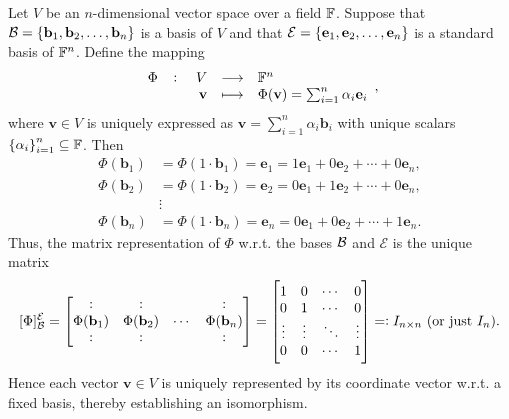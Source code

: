\documentclass[11pt,openany]{article}
\renewcommand{\vec}[1]{\mathbf{#1}}
\begin{document}
\begin{example*}
\begin{center}
\begin{tikzpicture}[scale=1, >=Stealth]
\end{tikzpicture}
\end{center}
\vfill
Let \(V\) be an \(n\)-dimensional vector space over a field \(\F\). Suppose that \(\basis=\{\vec{b}_1, \vec{b}_2, \dots, \vec{b}_n\}\) is a basis of $V$ and that $\mathcal{E}=\set{\vec{e}_1,\vec{e}_2,\dots,\vec{e}_n}$ is a standard basis of $\F^n$. 
Define the mapping \[
\fullfunction{\Phi}{V}{\F^n}{\vec{v}}{\Phi(\vec{v})=\sum_{i=1}^{n}\alpha_i\vec{e}_i},
\] where $\vec{v}\in V$ is uniquely expressed as $\vec{v}=\sum_{i=1}^{n}\alpha_i\vec{b}_i$ with unique scalars $\set{\alpha_i}_{i=1}^n\subseteq\F$. Then 
\begin{align*}
	\Phi(\vec{b}_1)&=\Phi(1\cdot\vec{b}_1)=\vec{e}_1=1\vec{e}_1+0\vec{e}_2+\cdots+0\vec{e}_n,\\
	\Phi(\vec{b}_2)&=\Phi(1\cdot\vec{b}_2)=\vec{e}_2=0\vec{e}_1+1\vec{e}_2+\cdots+0\vec{e}_n,\\
	&\vdots \\
	\Phi(\vec{b}_n)&=\Phi(1\cdot\vec{b}_n)=\vec{e}_n=0\vec{e}_1+0\vec{e}_2+\cdots+1\vec{e}_n.
\end{align*}
Thus, the matrix representation of $\Phi$ w.r.t. the bases $\basis$ and $\mathcal{E}$ is the unique matrix \[
[\Phi]_{\basis}^{\mathcal{E}}=\begin{bmatrix}
	: & : & & : \\
	\Phi(\vec{b}_1) & \Phi(\vec{b}_2) & \cdots & \Phi(\vec{b}_n) \\
	: & : & & : \\
\end{bmatrix}=\begin{bmatrix}
1 & 0 & \cdots & 0\\
0 & 1 & \cdots & 0\\
\vdots & \vdots & \ddots &\vdots  \\
0 & 0 & \cdots & 1\\
\end{bmatrix}=:I_{n\times n}\ (\text{or just $I_n$}).
\] Hence each vector \(\vec{v} \in V\) is uniquely represented by its coordinate vector w.r.t. a fixed basis, thereby establishing an isomorphism.
\end{example*}
\end{document}
